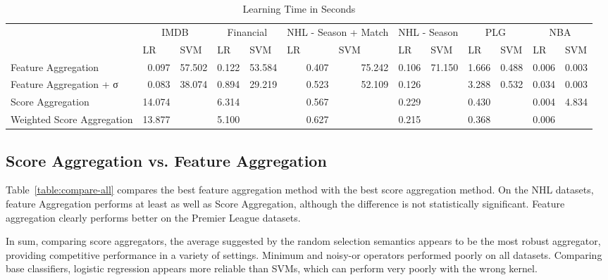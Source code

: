 \documentclass[conference]{IEEEtran}
\begin{document}
\begin{table*}[htbp]
\caption{Learning Time in Seconds}
\begin{tabular}{|l|r|l|r|l|r|l|r|l|r|l|r|r|}
\hline
\multicolumn{ 1}{|c|}{} & \multicolumn{ 2}{c|}{IMDB} & \multicolumn{ 2}{c|}{Financial} & \multicolumn{ 2}{c|}{NHL - Season + Match} & \multicolumn{ 2}{c|}{NHL - Season} & \multicolumn{ 2}{c|}{PLG} & \multicolumn{ 2}{c|}{NBA} \\ \cline{ 2- 13}
\multicolumn{ 1}{|l|}{} & \multicolumn{1}{l|}{LR} & SVM & \multicolumn{1}{l|}{LR} & SVM & \multicolumn{1}{l|}{LR} & SVM & \multicolumn{1}{l|}{LR} & SVM & \multicolumn{1}{l|}{LR} & SVM & \multicolumn{1}{l|}{LR} & \multicolumn{1}{l|}{SVM} \\ \hline
Feature Aggregation & 0.097 & \multicolumn{1}{r|}{57.502} & 0.122 & \multicolumn{1}{r|}{53.584} & 0.407 & \multicolumn{1}{r|}{75.242} & 0.106 & \multicolumn{1}{r|}{71.150} & 1.666 & \multicolumn{1}{r|}{0.488} & 0.006 & 0.003 \\ \hline
Feature Aggregation + σ & 0.083 & \multicolumn{1}{r|}{38.074} & 0.894 & \multicolumn{1}{r|}{29.219} & 0.523 & \multicolumn{1}{r|}{52.109} & 0.126 & & 3.288 & \multicolumn{1}{r|}{0.532} & 0.034 & 0.003 \\ \hline
Score Aggregation & 14.074 & & 6.314 & & 0.567 & & 0.229 & & 0.430 & & 0.004 & 4.834 \\ \hline
Weighted Score Aggregation & 13.877 & & 5.100 & & 0.627 & & 0.215 & & 0.368 & & 0.006 & \multicolumn{1}{l|}{} \\ \hline
\end{tabular}
\label{learning-times}
\end{table*}

\subsection{Score Aggregation vs. Feature Aggregation} Table~\ref{table:compare-all} compares the best feature aggregation method with the best score aggregation method. On the NHL datasets, feature Aggregation performs at least as well as Score Aggregation, although the difference is not statistically significant. Feature aggregation  clearly performs better on the Premier League datasets.

In sum, comparing score aggregators, the average suggested by the random selection semantics appears to be the most robust aggregator, providing competitive performance in a variety of settings. Minimum and noisy-or operators performed poorly on all datasets. Comparing base classifiers, logistic regression appears more reliable than SVMs, which can perform very poorly with the wrong kernel.
\end{document}
